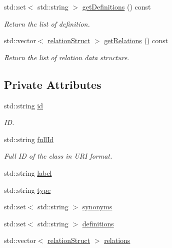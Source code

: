 \begin{DoxyCompactItemize}
std\-::set$<$ std\-::string $>$ \hyperlink{classunisys_1_1ClassBean_aaa76e4b0ade048567c4b8d52312ef1a9}{get\-Definitions} () const 
\begin{DoxyCompactList}\small\item\em Return the list of definition. \end{DoxyCompactList}\item 
std\-::vector$<$ \hyperlink{classunisys_1_1ClassBean_aabeda0465f295816c6f784d7e3cbdb97}{relation\-Struct} $>$ \hyperlink{classunisys_1_1ClassBean_a85e6aa6781b0379eb956fb1517496e82}{get\-Relations} () const 
\begin{DoxyCompactList}\small\item\em Return the list of relation data structure. \end{DoxyCompactList}\end{DoxyCompactItemize}
\subsection*{Private Attributes}
\begin{DoxyCompactItemize}
\item 
std\-::string \hyperlink{classunisys_1_1ClassBean_a0873b3a3895796ebf52f92860beea2a9}{id}
\begin{DoxyCompactList}\small\item\em I\-D. \end{DoxyCompactList}\item 
std\-::string \hyperlink{classunisys_1_1ClassBean_a99394c8ec3b4e477c7e44702e68310bb}{full\-Id}
\begin{DoxyCompactList}\small\item\em Full I\-D of the class in U\-R\-I format. \end{DoxyCompactList}\item 
std\-::string \hyperlink{classunisys_1_1ClassBean_ad68cdc52aa9e61e682f54cf5574d1b37}{label}
\item 
std\-::string \hyperlink{classunisys_1_1ClassBean_a3cd934e3687f96b0dc87a3fcafbec4ca}{type}
\item 
std\-::set$<$ std\-::string $>$ \hyperlink{classunisys_1_1ClassBean_a50623767ece8ef538c949558bfbc53af}{synonyms}
\item 
std\-::set$<$ std\-::string $>$ \hyperlink{classunisys_1_1ClassBean_af811d05369c1981390be001ad4b9b24d}{definitions}
\item 
std\-::vector$<$ \hyperlink{classunisys_1_1ClassBean_aabeda0465f295816c6f784d7e3cbdb97}{relation\-Struct} $>$ \hyperlink{classunisys_1_1ClassBean_a39022db9b3e14d792b3d73c7c85c253d}{relations}
\end{DoxyCompactItemize}


